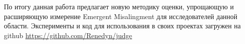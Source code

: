 \documentclass[a4paper,12pt]{extarticle}
\begin{document}
По итогу данная работа предлагает новую методику оценки, упрощающую и расширяющую измерение Emergent Misalingment для исследователей данной области. Эксперименты и код для использования в своих проектах загружен на github 
\url{https://github.com/Renedyn/judge}
\newpage
\printbibliography[heading=bibintoc]
\end{document}
